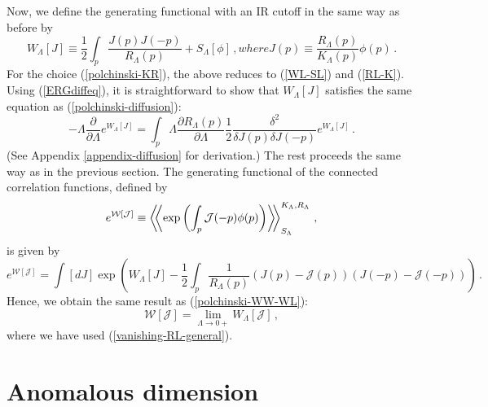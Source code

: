 \documentclass[aps,prd,preprint,groupedaddress,preprintnumbers,longbibliography]{revtex4-1}
\newcommand{\SL}{S_\Lambda}
\newcommand{\WW}{\mathcal{W}}
\newcommand{\JJ}{\mathcal{J}}
\newcommand{\vev}[1]{\left\langle #1 \right\rangle}
\newcommand{\vvev}[1]{\vev{\kern-0.3em\left\langle #1
    \right\rangle\kern-0.3em}}
\begin{document}
Now, we define the generating functional with an IR cutoff in the same
way as before by
\begin{subequations}
\label{WL-J-def}
\begin{equation}
W_\Lambda [J] \equiv \frac{1}{2} \int_p \frac{J (p) J(-p)}{R_\Lambda (p)} +
\SL [\phi]\,,
\end{equation}
where
\begin{equation}
J(p) \equiv \frac{R_\Lambda (p)}{K_\Lambda (p)} \phi (p)\,.
\end{equation}
\end{subequations}
For the choice (\ref{polchinski-KR}), the above reduces to
(\ref{WL-SL}) and (\ref{RL-K}). Using (\ref{ERGdiffeq}), it is
straightforward to show that $W_\Lambda [J]$ satisfies the same
equation as (\ref{polchinski-diffusion}):
\begin{equation}
- \Lambda \frac{\partial}{\partial \Lambda} e^{W_\Lambda [J]} = \int_p
\Lambda \frac{\partial R_\Lambda (p)}{\partial \Lambda} \frac{1}{2}
\frac{\delta^2}{\delta J(p) \delta J(-p)} e^{W_\Lambda [J]}\,.
\label{diffusion}
\end{equation}
(See Appendix \ref{appendix-diffusion} for derivation.)  The rest
proceeds the same way as in the previous section.  The generating
functional of the connected correlation functions, defined by
\begin{equation}
e^{\WW [\JJ]} \equiv \vvev{\exp \left( \int_p \JJ (-p) \phi (p)
  \right)}_{\SL}^{K_\Lambda, R_\Lambda}\,,
\end{equation}
is given by
\begin{equation}
e^{\WW [\JJ]} = \int [dJ] \exp \left( W_\Lambda [J] - \frac{1}{2}
  \int_p \frac{1}{R_\Lambda (p)} \left( J(p) - \mathcal{J} (p) \right)
  \left( J(-p) - \mathcal{J} (-p) \right)\right)\,.
\end{equation}
Hence,  we obtain the same result as
(\ref{polchinski-WW-WL}):
\begin{equation}
\WW [\JJ] = \lim_{\Lambda \to 0+} W_\Lambda [\JJ]\,,\label{WW-WL}
\end{equation}
where we have used (\ref{vanishing-RL-general}).

\section{Anomalous dimension\label{anomalous-dimension}}
\end{document}
